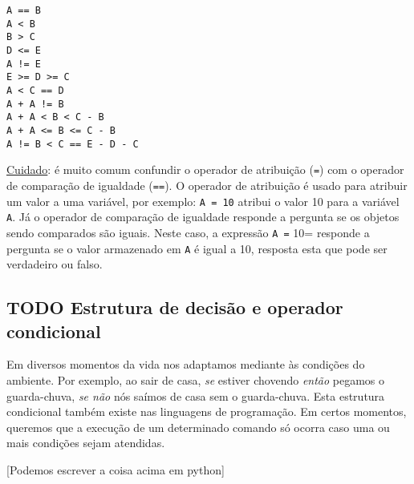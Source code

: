 \documentclass[11pt]{article}
\begin{document}
\begin{verbatim}
A == B
A < B
B > C
D <= E
A != E
E >= D >= C
A < C == D
A + A != B
A + A < B < C - B
A + A <= B <= C - B
A != B < C == E - D - C
\end{verbatim}

\uline{Cuidado}: é muito comum confundir o operador de atribuição (\texttt{=}) com o operador de comparação de igualdade (\texttt{==}). O operador de atribuição é usado para atribuir um valor a uma variável, por exemplo: \texttt{A = 10} atribui o valor 10 para a variável \texttt{A}. Já o operador de comparação de igualdade responde a pergunta se os objetos sendo comparados são iguais. Neste caso, a expressão \texttt{A =} 10= responde a pergunta se o valor armazenado em \texttt{A} é igual a 10, resposta esta que pode ser verdadeiro ou falso.

\subsection{{\bfseries\sffamily TODO} Estrutura de decisão e operador condicional}
\label{sec:orge2b54ea}

Em diversos momentos da vida nos adaptamos mediante às condições do ambiente. Por exemplo, ao sair de casa, \emph{se} estiver chovendo \emph{então} pegamos o guarda-chuva, \emph{se não} nós saímos de casa sem o guarda-chuva. Esta estrutura condicional também existe nas linguagens de programação. Em certos momentos, queremos que a execução de um determinado comando só ocorra caso uma ou mais condições sejam atendidas.

[Podemos escrever a coisa acima em python]
\end{document}
